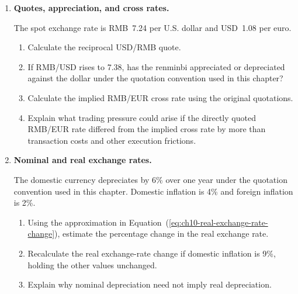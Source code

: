 

\begin{enumerate}

\item \textbf{Quotes, appreciation, and cross rates.}

The spot exchange rate is RMB~7.24 per U.S. dollar and USD~1.08 per euro.

\begin{enumerate}

\item Calculate the reciprocal USD/RMB quote.

\item If RMB/USD rises to 7.38, has the renminbi appreciated or depreciated against the dollar under the quotation convention used in this chapter?

\item Calculate the implied RMB/EUR cross rate using the original quotations.

\item Explain what trading pressure could arise if the directly quoted RMB/EUR rate differed from the implied cross rate by more than transaction costs and other execution frictions.

\end{enumerate}

\item \textbf{Nominal and real exchange rates.}

The domestic currency depreciates by 6\% over one year under the quotation convention used in this chapter. Domestic inflation is 4\% and foreign inflation is 2\%.

\begin{enumerate}

\item Using the approximation in Equation~(\ref{eq:ch10-real-exchange-rate-change}), estimate the percentage change in the real exchange rate.

\item Recalculate the real exchange-rate change if domestic inflation is 9\%, holding the other values unchanged.

\item Explain why nominal depreciation need not imply real depreciation.

\end{enumerate}


\end{enumerate}
